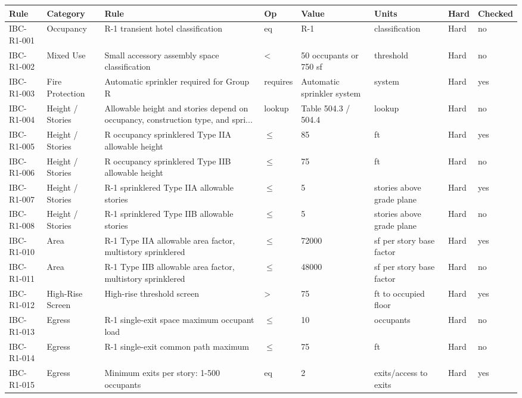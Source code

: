 \documentclass[10pt]{article}
\begin{document}
{\small\setlength{\tabcolsep}{3pt} \begin{longtable}{p{1.75cm}p{2.0cm}p{4.7cm}p{1.2cm}p{1.5cm}p{1.7cm}p{0.9cm}p{1.1cm}}
\toprule
\textbf{Rule} & \textbf{Category} & \textbf{Rule} & \textbf{Op} & \textbf{Value} & \textbf{Units} & \textbf{Hard} & \textbf{Checked} \\ \midrule \endhead
IBC-R1-001 & Occupancy & R-1 transient hotel classification & eq & R-1 & classification & Hard & no \\
IBC-R1-002 & Mixed Use & Small accessory assembly space classification & < & 50 occupants or 750 sf & threshold & Hard & no \\
IBC-R1-003 & Fire Protection & Automatic sprinkler required for Group R & requires & Automatic sprinkler system & system & Hard & yes \\
IBC-R1-004 & Height / Stories & Allowable height and stories depend on occupancy, construction type, and spri... & lookup & Table 504.3 / 504.4 & lookup & Hard & no \\
IBC-R1-005 & Height / Stories & R occupancy sprinklered Type IIA allowable height & $\le$ & 85 & ft & Hard & yes \\
IBC-R1-006 & Height / Stories & R occupancy sprinklered Type IIB allowable height & $\le$ & 75 & ft & Hard & no \\
IBC-R1-007 & Height / Stories & R-1 sprinklered Type IIA allowable stories & $\le$ & 5 & stories above grade plane & Hard & yes \\
IBC-R1-008 & Height / Stories & R-1 sprinklered Type IIB allowable stories & $\le$ & 5 & stories above grade plane & Hard & no \\
IBC-R1-010 & Area & R-1 Type IIA allowable area factor, multistory sprinklered & $\le$ & 72000 & sf per story base factor & Hard & yes \\
IBC-R1-011 & Area & R-1 Type IIB allowable area factor, multistory sprinklered & $\le$ & 48000 & sf per story base factor & Hard & no \\
IBC-R1-012 & High-Rise Screen & High-rise threshold screen & > & 75 & ft to occupied floor & Hard & yes \\
IBC-R1-013 & Egress & R-1 single-exit space maximum occupant load & $\le$ & 10 & occupants & Hard & no \\
IBC-R1-014 & Egress & R-1 single-exit common path maximum & $\le$ & 75 & ft & Hard & no \\
IBC-R1-015 & Egress & Minimum exits per story: 1-500 occupants & eq & 2 & exits/access to exits & Hard & yes \\

\end{longtable}}
\end{document}

